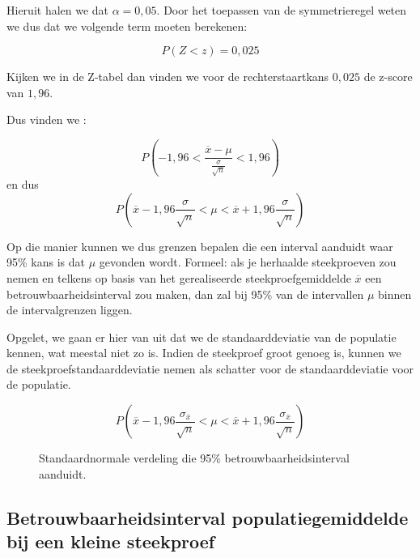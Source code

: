 {Hieruit halen we dat $\alpha = 0,05$. Door het toepassen van de symmetrieregel weten we dus dat we volgende term moeten berekenen:

\[ P( Z < z) = 0,025 \]

Kijken we in de Z-tabel dan vinden we voor de rechterstaartkans $0,025$ de z-score van $1,96$.

Dus vinden we :

\[ P( -1,96 < \frac{\overline{x} - \mu}{\frac{\sigma}{\sqrt{n}}} < 1,96 ) \]
en dus
\[ P ( \overline{x} -1,96 \frac{\sigma}{\sqrt{n}} <\mu < \overline{x} + 1,96 \frac{\sigma}{\sqrt{n}}) \]

Op die manier kunnen we dus grenzen bepalen die een interval aanduidt waar 95\% kans is dat $\mu$ gevonden wordt. Formeel: als je herhaalde steekproeven zou nemen en telkens op basis van het gerealiseerde steekproefgemiddelde $\overline{x}$ een betrouwbaarheidsinterval zou maken, dan zal bij 95\% van de intervallen $\mu$ binnen de intervalgrenzen liggen.

Opgelet, we gaan er hier van uit dat we de standaarddeviatie van de populatie kennen, wat meestal niet zo is. Indien de steekproef groot genoeg is, kunnen we de steekproefstandaarddeviatie nemen als schatter voor de standaarddeviatie voor de populatie.

\[ P ( \overline{x} -1,96 \frac{\sigma_{\overline{x}}}{\sqrt{n}} < \mu < \overline{x} + 1,96 \frac{\sigma_{\overline{x}}}{\sqrt{n}}) \]


\begin{figure}[t]
\centering
{}
\caption{Standaardnormale verdeling die 95\% betrouwbaarheidsinterval aanduidt.}
\label{fig:verdelingStandaardnormaal}
\end{figure}

\subsection{Betrouwbaarheidsinterval populatiegemiddelde bij een kleine steekproef}

}
